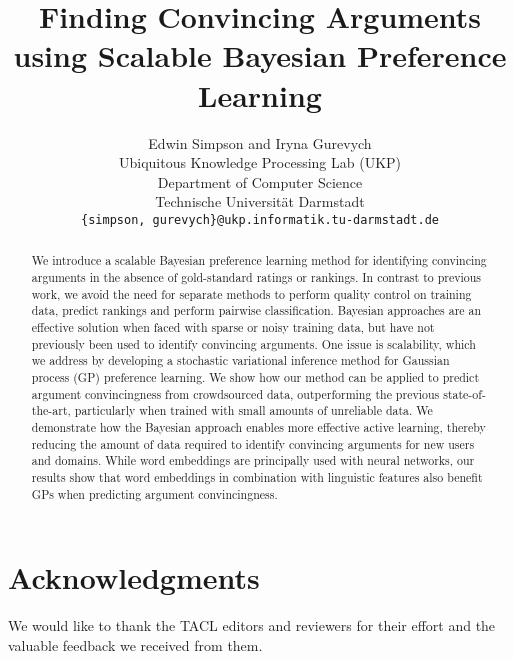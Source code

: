\documentclass[11pt,letterpaper]{article}
\title{ 
Finding Convincing Arguments using Scalable Bayesian Preference Learning
}
\author{Edwin Simpson and Iryna Gurevych\\
  Ubiquitous Knowledge Processing Lab (UKP)\\
  Department of Computer Science \\
  Technische Universit{\"a}t Darmstadt  \\
  {\tt \{simpson, gurevych\}@ukp.informatik.tu-darmstadt.de} \\}
\date{}
\begin{document}
\maketitle
\begin{abstract}
We introduce a scalable Bayesian preference learning method for identifying
convincing arguments in the absence of gold-standard ratings or rankings.
In contrast to previous work, we avoid the need for separate methods
to perform quality control on training data, predict rankings and perform pairwise classification.
Bayesian approaches are an effective solution when faced with sparse or noisy training data, 
but have not previously been used to identify convincing arguments.
One issue is scalability, which we address by developing a 
stochastic variational inference method for Gaussian process (GP) preference learning.
We show how our method can be applied to predict argument convincingness from crowdsourced data, 
outperforming the previous state-of-the-art, particularly when trained with small amounts of unreliable data.  
We demonstrate how the Bayesian approach enables more effective active learning,
thereby reducing the amount of data required to identify convincing arguments for new users and domains.
While word embeddings are principally used with neural networks, our results show that word embeddings in combination with linguistic features also benefit GPs when predicting argument convincingness.
\end{abstract}

%








\section*{Acknowledgments}

We would like to thank the TACL editors and reviewers for their effort and the valuable feedback we received from them.


%



\end{document}
